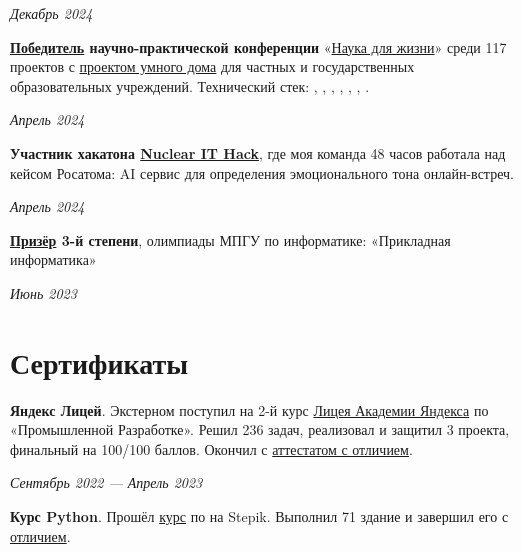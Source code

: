 \documentclass[margin,line]{resume}
\begin{document}
\begin{resume}
  \vspace{-6mm}

  \hfill \textsl{Декабрь 2024}

  \textbf{\href{https://github.com/alchemmist/CV/blob/main/attachments/scince-for-life-win.pdf}{Победитель}
  научно-практической конференции}
  «\href{https://conf.profil.mos.ru/academ}{Наука для
  жизни}» среди 117 проектов с
  \href{https://github.com/smart-cab/}{проектом умного
  дома} для частных и государственных
  образовательных учреждений. Технический стек: ,
  , , ,
  , , .
  \vspace{-6mm}

  \hfill \textsl{Апрель 2024}

  \vspace{-2mm}
  \textbf{Участник хакатона \href{https://nuclearhack.mephi.ru/}{Nuclear
  IT Hack}}, где моя команда 48 часов работала
  над кейсом Росатома: AI сервис для определения эмоционального тона
  онлайн-встреч.

  \vspace{-7mm}

  \hfill \textsl{Апрель 2024}

  \textbf{\href{https://github.com/alchemmist/CV/blob/main/attachments/informatics-olimpic.pdf}{Призёр}
  3-й степени}, олимпиады МПГУ по информатике:
  «Прикладная информатика»
  \vspace{-2mm}

  \hfill \textsl{Июнь 2023}

  \section{\mysidestyle Сертификаты}
  \textbf{Яндекс Лицей}. Экстерном поступил на 2-й курс
  \href{https://lyceum.yandex.ru/}{Лицея
  Академии Яндекса} по «Промышленной Разработке». Решил 236 задач,
  реализовал и защитил 3 проекта, финальный на 100/100 баллов. Окончил с
  \href{https://github.com/alchemmist/CV/blob/main/attachments/yandex-lyceum.pdf}{аттестатом
  с отличием}.

  \vspace{-6mm}

  \hfill \textsl{Сентябрь 2022 — Апрель 2023}

  \textbf{Курс Python}. Прошёл
  \href{https://stepik.org/course/67}{курс} по  на
  Stepik. Выполнил 71
  здание и завершил его с
  \href{https://github.com/alchemmist/CV/blob/main/attachments/stepik-python-course.pdf}{отличием}.


\end{resume}
\end{document}
